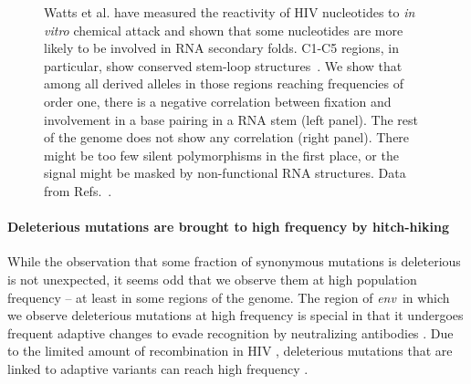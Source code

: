 \documentclass[rmp, twocolumn]{revtex4}
\newcommand{\env}{\textit{env}}
\begin{document}
\begin{figure}
\begin{center}
\caption{Watts et al. have measured the reactivity of HIV nucleotides to {\it
in vitro} chemical attack and shown that some nucleotides are more likely to
be involved in RNA secondary folds. C1-C5 regions, in particular, show
conserved stem-loop structures~\citep{watts_architecture_2009}. We show that
among all derived alleles in those regions reaching frequencies of order one,
there is a negative correlation between fixation and involvement in a base
pairing in a RNA stem (left panel). The rest of the genome does not show any
correlation (right panel). There might be too few silent polymorphisms in the
first place, or the signal might be masked by non-functional RNA
structures. Data from Refs.~\cite{shankarappa_consistent_1999,
bunnik_autologous_2008, liu_selection_2006}.}
\label{fig:SHAPE}
\end{center}
\end{figure}


\paragraph{Deleterious mutations are brought to high frequency by hitch-hiking}
While the observation that some fraction of synonymous mutations is deleterious is not unexpected, it seems odd that we observe them at high population frequency -- at least in some regions of the genome. The region of \env~in which we observe deleterious mutations at high frequency is special in that it undergoes frequent adaptive changes to evade recognition by neutralizing antibodies \cite{Williamson}. Due to the limited amount of recombination in HIV \cite{neher_recombination_2010,batorsky_2011}, deleterious mutations that are linked to adaptive variants can reach high frequency \citep{maynard_smith}.
\end{document}
